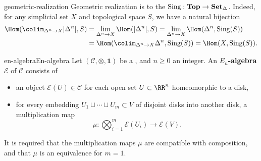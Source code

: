 \begin{example}{geometric-realization}
    Geometric realization is  to the  $\textup{Sing} : \textbf{Top} \to \textbf{Set}_\Delta$. Indeed, for any simplicial set $X$ and topological space $S$, we have a natural bijection
    \[ \begin{aligned}
        \Hom(\colim_{\Delta^n \to X} |\Delta^n|, S) &= \lim_{\Delta^n \to X} \Hom(|\Delta^n|, S) = \lim_{\Delta^n \to X} \Hom(\Delta^n, \textup{Sing}(S)) \\ & = \Hom(\colim_{\Delta^n \to X} \Delta^n, \textup{Sing}(S)) = \Hom(X, \textup{Sing}(S)) .
    \end{aligned} \]
\end{example}

\begin{topic}{en-algebra}{En-algebra}
    Let $(\mathcal{C}, \otimes, \textbf{1})$ be a  , and $n \ge 0$ an integer. An \textbf{$E_n$-algebra} $\mathcal{E}$ of $\mathcal{C}$ consists of
    \begin{itemize}
        \item an object $\mathcal{E}(U) \in \mathcal{C}$ for each open set $U \subset \RR^n$ homeomorphic to a disk,
        \item for every embedding $U_1 \sqcup \cdots \sqcup U_m \subset V$ of disjoint disks into another disk, a multiplication map
        \[ \mu : \bigotimes_{i = 1}^{m} \mathcal{E}(U_i) \to \mathcal{E}(V) . \]
    \end{itemize}
    It is required that the multiplication maps $\mu$ are compatible with composition, and that $\mu$ is an equivalence for $m = 1$.
\end{topic}

